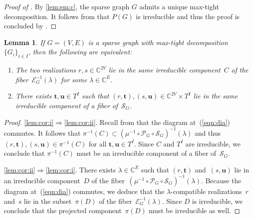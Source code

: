 \documentclass[12pt]{article}
\newtheorem{lemma}{Lemma}
\theoremstyle{definition}
\newenvironment{Menum}{\begin{enumerate}[topsep=0pt,itemsep=0pt,leftmargin=10mm,label=(\roman*),ref=(\roman*)]}{\end{enumerate}}
\newcommand{\EQN}[1]{(\ref{eqn:#1})}
\newcommand{\RL}[2]{\Cref{lem:#1}\ref{lem:#1:#2}}
\newcommand{\st}{such that }
\newcommand{\C}{{\mathbb{C}}}
\newcommand{\cE}{\mathcal{E}}
\newcommand{\cP}{\mathcal{P}}
\newcommand{\cS}{\mathcal{S}}
\newcommand{\bt}{\mathbf{t}}
\newcommand{\bu}{\mathbf{u}}
\begin{document}
\begin{proof}[Proof of ]
By \RL{em}{c}, the sparse graph $G$ admits a unique max-tight decomposition.
It follows from  that $P(G)$ is irreducible
and thus the proof is concluded by .
\end{proof}


\begin{lemma}
\label{lem:cor}
If $G=(V,E)$ is a sparse graph with max-tight decomposition~$\{G_i\}_{i\in I}$,
then the following are equivalent:
\begin{Menum}
\item\label{lem:cor:i}
The two realizations $r,s\in\C^{2V}$ lie in the same irreducible
component~$C$ of the fiber~$\cE_G^{-1}(\lambda)$ for some $\lambda\in\C^E$.
\item\label{lem:cor:ii}
There exists $\bt,\bu\in T^I$ \st
$(r,\bt),(s,\bu)\in \C^{2V}\times T^I$
lie in the same irreducible component of a fiber
of~$\cS_G$.
\end{Menum}
\end{lemma}

\begin{proof}
\ref{lem:cor:i}$\Rightarrow$\ref{lem:cor:ii}.
Recall from  that the diagram at~\EQN{dia} commutes.
It follows that $\pi^{-1}(C)\subset (\mu^{-1}\circ\cP_G\circ\cS_G)^{-1}(\lambda)$
and thus $(r,\bt),(s,\bu)\in\pi^{-1}(C)$ for all $\bt,\bu\in T^I$.
Since $C$ and $T^I$ are irreducible, we conclude that $\pi^{-1}(C)$ must be an irreducible component
of a fiber of~$\cS_G$.

\ref{lem:cor:ii}$\Rightarrow$\ref{lem:cor:i}.
There exists $\lambda\in\C^E$
\st $(r,\bt)$ and~$(s,\bu)$ lie in an irreducible component~$D$
of the fiber~$(\mu^{-1}\circ\cP_G\circ\cS_G)^{-1}(\lambda)$.
Because the diagram at~\EQN{dia} commutes, we deduce that the $\lambda$-compatible realizations~$r$
and~$s$ lie in the subset~$\pi(D)$ of the fiber~$\cE_G^{-1}(\lambda)$.
Since $D$ is irreducible, we conclude that the projected component~$\pi(D)$ must be irreducible as well.
\end{proof}
\end{document}
